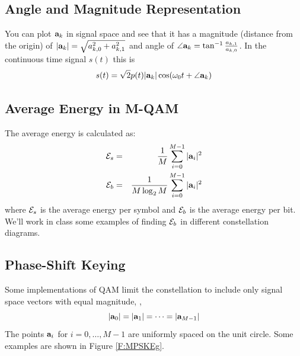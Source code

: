 \subsection{Angle and Magnitude Representation}

You can plot $\mathbf{a}_k$ in signal space and see that it has a
magnitude (distance from the origin) of $| \mathbf{a}_k| = \sqrt{a_{k,0}^2
+ a_{k,1}^2}$ and angle of $\angle \mathbf{a}_k =
\tan^{-1}\frac{a_{k,1}}{a_{k,0}}$.  In the continuous time signal
$s(t)$ this is
\[
s(t) = \sqrt{2} p(t) | \mathbf{a}_k |  \cos(\omega_0 t + \angle \mathbf{a}_k)
\]

\subsection{Average Energy in M-QAM}

The average energy is calculated as:
\begin{eqnarray}
  \mathcal{E}_s &=& \frac{1}{M} \sum_{i=0}^{M-1} |\mathbf{a}_i|^2 \nonumber \\ 
  \mathcal{E}_b &=& \frac{1}{M \log_2 M} \sum_{i=0}^{M-1} |\mathbf{a}_i|^2 \nonumber
\end{eqnarray}
where $\mathcal{E}_s$ is the average energy per symbol and $\mathcal{E}_b$ is the
average energy per bit.  We'll work in class some examples of
finding $\mathcal{E}_b$ in different constellation diagrams.



\subsection{Phase-Shift Keying}

Some implementations of QAM limit the constellation to include only
signal space vectors with equal magnitude, \ie,
\[
  |\mathbf{a}_0| = |\mathbf{a}_1| = \cdots = |\mathbf{a}_{M-1}|
\]
The points $\mathbf{a}_i$ for $i=0, \ldots, M-1$ are uniformly spaced on
the unit circle.  Some examples are shown in Figure \ref{F:MPSKEg}.


